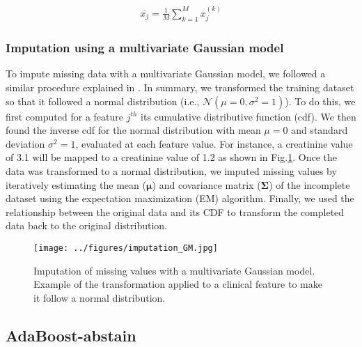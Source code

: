 \documentclass[
   technote
]{phildoc}
\newcommand{\ie}{i.e.,}
\newcommand{\fig}{Fig.}
\newcommand{\mx}[1]{{\color{green}{MX: #1}}}
\begin{document}

\begin{eqnarray}
\label{eqn:mean_value}
\bar{x_{j}} = \frac{1}{M}\sum_{k=1}^M x_{j}^{(k)}
\end{eqnarray}  

\subsubsection{Imputation using a multivariate Gaussian model}
\label{sec:multiv-gauss}
To impute missing data with a multivariate Gaussian model, we followed a similar procedure explained in \cite{Schneider:2001}. In summary, we transformed the training dataset so that it followed a normal distribution (\ie{} $\mathcal{N}(\mu=0,\sigma^{2}=1)$). To do this, we  first computed for a feature $j^{th}$ its cumulative distributive function (cdf). We then found the inverse cdf for the normal distribution with mean $\mu=0$ and standard deviation $\sigma^{2}=1$, evaluated at each feature value. For instance, a creatinine value of 3.1 will be mapped to a creatinine value of 1.2 as shown in \fig{}\ref{fig:impute_GM}. Once the data was transformed to a normal distribution, we imputed missing values by iteratively estimating the mean ($\bm{\mu}$) and covariance matrix ($\bm{\Sigma}$) of the incomplete dataset using the expectation maximization (EM) algorithm. Finally, we used the relationship between the original data and its CDF to transform the completed data back to the original distribution.

\begin{figure}[ht!]
	\centering
	\texttt{[image: ../figures/imputation\_GM.jpg]}
	\caption{Imputation of missing values with a multivariate Gaussian model. Example of the transformation applied to a clinical feature to make it follow a normal distribution.} 
	\label{fig:impute_GM}      
\end{figure}


      
\subsection{AdaBoost-abstain}
\label{sec:adaboost}

\end{document}
